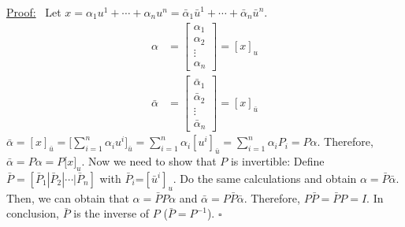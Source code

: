 \documentclass[letterpaper]{article}
\begin{document}
\noindent \underline{Proof:}~ Let $x=\alpha_1u^1+\dotsb+\alpha_nu^n=\bar{\alpha}_1\bar{u}^1+\dotsb+\bar{\alpha}_n\bar{u}^n$.
    \begin{align*}
        \alpha&=\begin{bmatrix}\alpha_{1}\\
            \alpha_{2}\\
            \vdots\\
            \alpha_{n}
        \end{bmatrix}=[x]_{u}\\
        \bar{\alpha}&=\begin{bmatrix}\bar{\alpha}_{1}\\
            \bar{\alpha}_{2}\\
            \vdots\\
            \bar{\alpha}_{n}
        \end{bmatrix}=[x]_{\bar{u}}
    \end{align*}
    $\bar{\alpha}=[x]_{\bar{u}}=\Big[ \displaystyle\sum_{i=1}^{n}\alpha_{i}u^{i}\Big]_{\bar{u}}=\displaystyle\sum_{i=1}^{n}\alpha_{i}[u^{i}]_{\bar{u}}=\displaystyle\sum_{i=1}^{n}\alpha_{i} P_{i}=P\alpha$.
    \newline
    Therefore, $\bar{\alpha} = P\alpha = P{[}x{]}_{u}$.
    \newline\newline
    Now we need to show that $P$ is invertible:
    \newline
    Define $\bar{P} = [\bar{P}_{1}|\bar{P}_{2}| \dotsb  |\bar{P}_{n}]$ with $\bar{P}_{i}$=$[\bar{u}^{i}]_{u}$.
    \newline
    Do the same calculations and obtain $\alpha=\bar{P}\bar{\alpha}$.
    \newline
    Then, we can obtain that $\alpha=\bar{P}P\alpha$ and $\bar{\alpha}=P\bar{P}\bar{\alpha}$.
    \newline
    Therefore, $P\bar{P} = \bar{P}P = I$.
    \newline
    In conclusion, $\bar{P}$ is the inverse of $P$ ($ \bar{P}=P^{-1}$). $\square$

    \newpage
\end{document}
